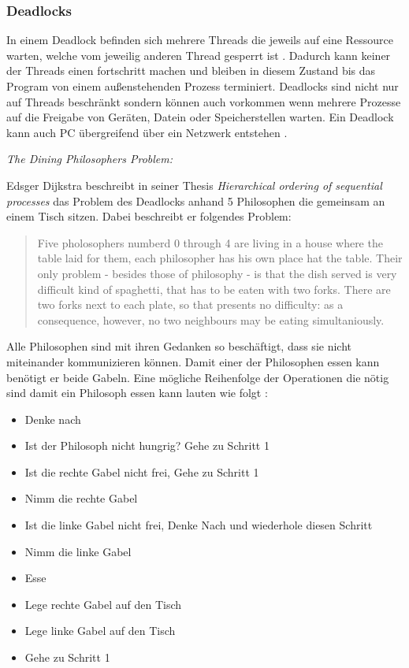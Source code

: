 \subsubsection{Deadlocks}

In einem Deadlock befinden sich mehrere Threads die jeweils auf eine Ressource warten, welche vom jeweilig anderen Thread gesperrt ist \cite[p. 1]{Jah04}. Dadurch kann keiner der Threads einen fortschritt machen und bleiben in diesem Zustand bis das Program von einem außenstehenden Prozess terminiert. Deadlocks sind nicht nur auf Threads beschränkt sondern können auch vorkommen wenn mehrere Prozesse auf die Freigabe von Geräten, Datein oder Speicherstellen warten. Ein Deadlock kann auch PC übergreifend über ein Netzwerk entstehen \cite[p. 177]{tan09}. 

\emph{The Dining Philosophers Problem:}

Edsger Dijkstra beschreibt in seiner Thesis \emph{Hierarchical ordering of sequential processes} das Problem des Deadlocks anhand 5 Philosophen die gemeinsam an einem Tisch sitzen. Dabei beschreibt er folgendes Problem:

\begin{quote}
	Five pholosophers numberd 0 through 4 are living in a house where the table laid for them, each philosopher has his own place hat the table. Their only problem - besides those of philosophy - is that the dish served is very difficult kind of spaghetti, that has to be eaten with two forks. There are two forks next to each plate, so that presents no difficulty: as a consequence, however, no two neighbours may be eating simultaniously. \cite[p. 21]{dij71}
\end{quote} 

Alle Philosophen sind mit ihren Gedanken so beschäftigt, dass sie nicht miteinander kommunizieren können. Damit einer der Philosophen essen kann benötigt er beide Gabeln. Eine mögliche Reihenfolge der Operationen die nötig sind damit ein Philosoph essen kann lauten wie folgt \cite[p. 21]{dij71}:

\begin{itemize}
  \item Denke nach
  \item Ist der Philosoph nicht hungrig? Gehe zu Schritt 1
  \item Ist die rechte Gabel nicht frei, Gehe zu Schritt 1
  \item Nimm die rechte Gabel
  \item Ist die linke Gabel nicht frei, Denke Nach und wiederhole diesen Schritt
  \item Nimm die linke Gabel
  \item Esse
  \item Lege rechte Gabel auf den Tisch  
  \item Lege linke Gabel auf den Tisch
  \item Gehe zu Schritt 1
\end{itemize}

